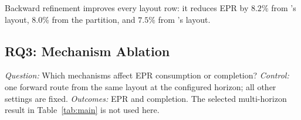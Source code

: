 Backward refinement improves every layout row: it reduces EPR by $8.2\%$
from \dSABRE{}'s layout, $8.0\%$ from the partition, and $7.5\%$ from
\PORTER{}'s layout.

\subsection{RQ3: Mechanism Ablation}
\label{sec:ablation}

\emph{Question:} Which mechanisms affect EPR consumption or completion?
\emph{Control:} one forward route from the same layout at the configured
horizon; all other settings are fixed. \emph{Outcomes:} EPR and completion.
The selected multi-horizon result in Table~\ref{tab:main} is not used here.

\begin{table}[t]
\centering
\caption{80-qubit ablation. ``No pk'' disables \TeleGatePacket{}; ``No
rel.'' disables both relief tiers; ``\TeleData{}'' removes the \TeleGate{}
family and also changes relief eligibility. ``pk''/``tg'' are the full
configuration's packet and single-\TeleGate{} counts. $^{\dagger}$ denotes
non-completion. Geometric means are reported only over rows completed by
both variants in the stated comparison.}
\label{tab:ablation}
\setlength{\tabcolsep}{3.4pt}
\small
{}
\end{table}

